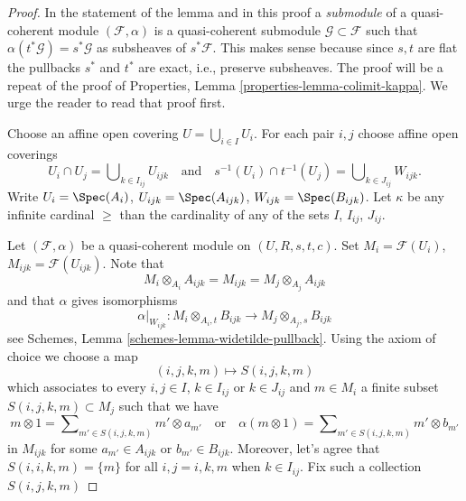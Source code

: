 \begin{proof}
In the statement of the lemma and in this proof
a {\it submodule} of a quasi-coherent module $(\mathcal{F}, \alpha)$
is a quasi-coherent submodule $\mathcal{G} \subset \mathcal{F}$
such that $\alpha(t^*\mathcal{G}) = s^*\mathcal{G}$ as subsheaves of
$s^*\mathcal{F}$. This makes sense because since $s, t$ are flat the
pullbacks $s^*$ and $t^*$ are exact, i.e., preserve subsheaves.
The proof will be a repeat of the proof of
Properties, Lemma \ref{properties-lemma-colimit-kappa}.
We urge the reader to read that proof first.

\medskip\noindent
Choose an affine open covering $U = \bigcup_{i \in I} U_i$.
For each pair $i, j$ choose affine open coverings
$$
U_i \cap U_j = \bigcup\nolimits_{k \in I_{ij}} U_{ijk}
\quad\text{and}\quad
s^{-1}(U_i) \cap t^{-1}(U_j) = \bigcup\nolimits_{k \in J_{ij}} W_{ijk}.
$$
Write $U_i = \Spec(A_i)$, $U_{ijk} = \Spec(A_{ijk})$,
$W_{ijk} = \Spec(B_{ijk})$.
Let $\kappa$ be any infinite cardinal $\geq$ than the cardinality
of any of the sets $I$, $I_{ij}$, $J_{ij}$.

\medskip\noindent
Let $(\mathcal{F}, \alpha)$ be a quasi-coherent module on $(U, R, s, t, c)$.
Set $M_i = \mathcal{F}(U_i)$, $M_{ijk} = \mathcal{F}(U_{ijk})$.
Note that
$$
M_i \otimes_{A_i} A_{ijk} = M_{ijk} = M_j \otimes_{A_j} A_{ijk}
$$
and that $\alpha$ gives isomorphisms
$$
\alpha|_{W_{ijk}} :
M_i \otimes_{A_i, t} B_{ijk}
\longrightarrow
M_j \otimes_{A_j, s} B_{ijk}
$$
see
Schemes, Lemma \ref{schemes-lemma-widetilde-pullback}.
Using the axiom of choice we choose a map
$$
(i, j, k, m) \mapsto S(i, j, k, m)
$$
which associates to every $i, j \in I$, $k \in I_{ij}$ or $k \in J_{ij}$
and $m \in M_i$ a finite subset $S(i, j, k, m) \subset M_j$
such that we have
$$
m \otimes 1 = \sum\nolimits_{m' \in S(i, j, k, m)} m' \otimes a_{m'}
\quad\text{or}\quad
\alpha(m \otimes 1) = \sum\nolimits_{m' \in S(i, j, k, m)} m' \otimes b_{m'}
$$
in $M_{ijk}$ for some $a_{m'} \in A_{ijk}$ or $b_{m'} \in B_{ijk}$.
Moreover, let's agree that $S(i, i, k, m) = \{m\}$ for all
$i, j = i, k, m$ when $k \in I_{ij}$. Fix such a collection $S(i, j, k, m)$


\end{proof}
